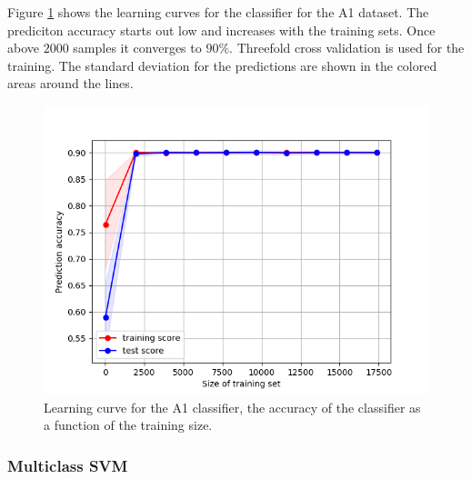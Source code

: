             Figure \ref{fig:learning_curves_A1} shows the learning curves for the classifier for the A1 dataset. The prediciton accuracy starts out low and increases with the training sets. Once above $2000$ samples it converges to $90\%$. Threefold cross validation is used for the training. The standard deviation for the predictions are shown in the colored areas around the lines. 
            
            \begin{figure}[]
                \centering
                \includegraphics[scale = 0.6]{figures/analysis/oneclass_servo/LearningCurves_A1.png}
                \caption{Learning curve for the A1 classifier, the accuracy of the classifier as a function of the training size.}
                \label{fig:learning_curves_A1}
            \end{figure}
        
        \clearpage
        \subsubsection{Multiclass SVM}
            
